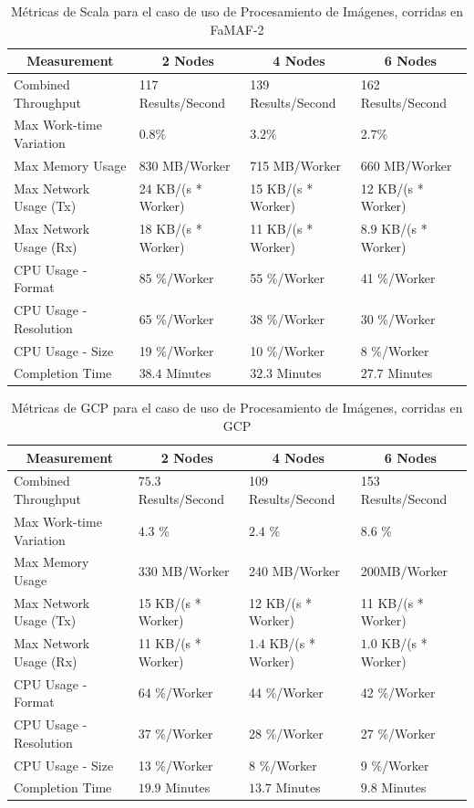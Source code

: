 \documentclass[11pt]{article}
\newcommand{\ipcap}[2]{\caption{Métricas de #1 para el caso de uso de Procesamiento de Imágenes, corridas en #2}}
\begin{document}
\begin{table}[H]
\centering
\begin{tabular}{|l|l|l|l|}
\hline
\multicolumn{1}{|c|}{Measurement} & \multicolumn{1}{c|}{2 Nodes} & \multicolumn{1}{c|}{4 Nodes} & \multicolumn{1}{c|}{6 Nodes} \\ \hline
Combined Throughput & 117 Results/Second & 139 Results/Second & 162 Results/Second \\ \hline
Max Work-time Variation & $0.8\%$& $3.2\%$& $2.7\%$\\ \hline
Max Memory Usage & 830 MB/Worker & 715 MB/Worker & 660 MB/Worker \\ \hline
Max Network Usage (Tx) & 24 KB/(s * Worker) & 15 KB/(s * Worker) & 12 KB/(s * Worker) \\ \hline
Max Network Usage (Rx) & 18 KB/(s * Worker) & 11 KB/(s * Worker) & $8.9$ KB/(s * Worker) \\ \hline
CPU Usage - Format & 85 \%/Worker & 55 \%/Worker & 41 \%/Worker \\ \hline
CPU Usage - Resolution & 65 \%/Worker & 38 \%/Worker & 30 \%/Worker \\ \hline
CPU Usage - Size & 19 \%/Worker & 10 \%/Worker & 8 \%/Worker \\ \hline
Completion Time & $38.4$ Minutes & $32.3$ Minutes & $27.7$ Minutes \\ \hline
\end{tabular}
\ipcap{Scala}{FaMAF-2}
\end{table}

\begin{table}[H]
\centering
\begin{tabular}{|l|l|l|l|}
\hline
\multicolumn{1}{|c|}{Measurement} & \multicolumn{1}{c|}{2 Nodes} & \multicolumn{1}{c|}{4 Nodes} & \multicolumn{1}{c|}{6 Nodes} \\ \hline
Combined Throughput & $75.3$ Results/Second & 109 Results/Second & 153 Results/Second \\ \hline
Max Work-time Variation & $4.3$ \% & $2.4$ \% & $8.6$ \% \\ \hline
Max Memory Usage & 330 MB/Worker & 240 MB/Worker & 200MB/Worker \\ \hline
Max Network Usage (Tx) & 15 KB/(s * Worker) & 12 KB/(s * Worker) & 11 KB/(s * Worker) \\ \hline
Max Network Usage (Rx) & 11 KB/(s * Worker) & $1.4$ KB/(s * Worker) & $1.0$ KB/(s * Worker) \\ \hline
CPU Usage - Format & 64 \%/Worker & 44 \%/Worker & 42 \%/Worker \\ \hline
CPU Usage - Resolution & 37 \%/Worker & 28 \%/Worker & 27 \%/Worker \\ \hline
CPU Usage - Size & 13 \%/Worker & 8 \%/Worker & 9 \%/Worker \\ \hline
Completion Time & $19.9$ Minutes & $13.7$ Minutes & $9.8$ Minutes \\ \hline
\end{tabular}
\ipcap{GCP}{GCP}
\end{table}
\end{document}
